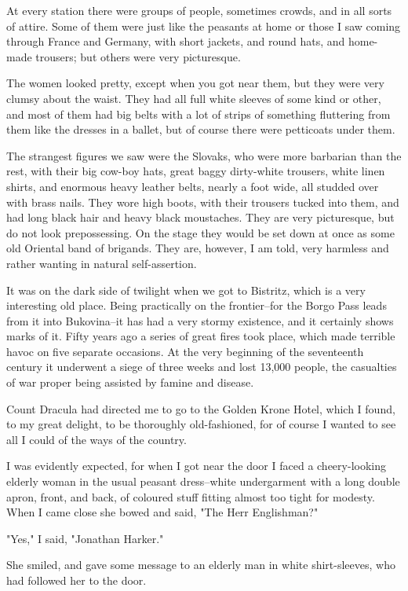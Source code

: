 At every station there were groups of people, sometimes crowds, and in all sorts of attire. Some of them were just like the peasants at home or those I saw coming through France and Germany, with short jackets, and round hats, and home-made trousers; but others were very picturesque. 

The women looked pretty, except when you got near them, but they were very clumsy about the waist. They had all full white sleeves of some kind or other, and most of them had big belts with a lot of strips of something fluttering from them like the dresses in a ballet, but of course there were petticoats under them. 

The strangest figures we saw were the Slovaks, who were more barbarian than the rest, with their big cow-boy hats, great baggy dirty-white trousers, white linen shirts, and enormous heavy leather belts, nearly a foot wide, all studded over with brass nails. They wore high boots, with their trousers tucked into them, and had long black hair and heavy black moustaches. They are very picturesque, but do not look prepossessing. On the stage they would be set down at once as some old Oriental band of brigands. They are, however, I am told, very harmless and rather wanting in natural self-assertion. 

It was on the dark side of twilight when we got to Bistritz, which is a very interesting old place. Being practically on the frontier--for the Borgo Pass leads from it into Bukovina--it has had a very stormy existence, and it certainly shows marks of it. Fifty years ago a series of great fires took place, which made terrible havoc on five separate occasions. At the very beginning of the seventeenth century it underwent a siege of three weeks and lost 13,000 people, the casualties of war proper being assisted by famine and disease. 

Count Dracula had directed me to go to the Golden Krone Hotel, which I found, to my great delight, to be thoroughly old-fashioned, for of course I wanted to see all I could of the ways of the country. 

I was evidently expected, for when I got near the door I faced a cheery-looking elderly woman in the usual peasant dress--white undergarment with a long double apron, front, and back, of coloured stuff fitting almost too tight for modesty. When I came close she bowed and said, "The Herr Englishman?" 

"Yes," I said, "Jonathan Harker." 

She smiled, and gave some message to an elderly man in white shirt-sleeves, who had followed her to the door. 

